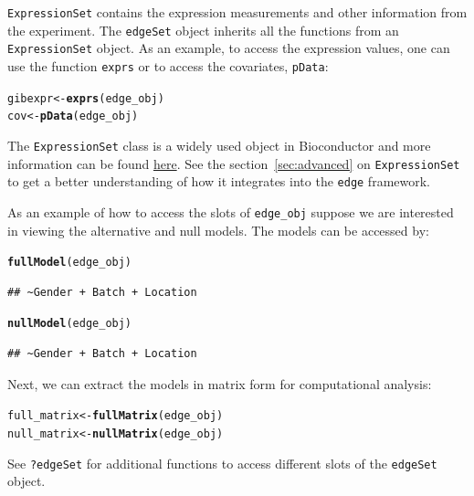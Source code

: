 \documentclass{article}\usepackage[]{graphicx}\usepackage[]{color}
\makeatletter
\newcommand{\hlstd}[1]{\textcolor[rgb]{0.345,0.345,0.345}{#1}}%
\newcommand{\hlkwb}[1]{\textcolor[rgb]{0.69,0.353,0.396}{#1}}%
\newcommand{\hlkwd}[1]{\textcolor[rgb]{0.737,0.353,0.396}{\textbf{#1}}}%
\newenvironment{kframe}{%
 \def\at@end@of@kframe{}%
 \ifinner\ifhmode%
  \def\at@end@of@kframe{\end{minipage}}%
  \begin{minipage}{\columnwidth}%
 \fi\fi%
 \def\FrameCommand##1{\hskip\@totalleftmargin \hskip-\fboxsep
 \colorbox{shadecolor}{##1}\hskip-\fboxsep
     \hskip-\linewidth \hskip-\@totalleftmargin \hskip\columnwidth}%
 \MakeFramed {\advance\hsize-\width
   \@totalleftmargin\z@ \linewidth\hsize
   \@setminipage}}%
 {\par\unskip\endMakeFramed%
 \at@end@of@kframe}
\newenvironment{knitrout}{}{} %
\makeatother
\begin{document}
{\tt ExpressionSet} contains the expression measurements and other information from the experiment. The {\tt edgeSet} object inherits all the functions from an {\tt ExpressionSet} object. As an example, to access the expression values, one can use the function {\tt exprs} or to access the covariates, {\tt pData}:
\begin{knitrout}
\color{fgcolor}\begin{kframe}
\begin{alltt}
\hlstd{gibexpr} \hlkwb{<-} \hlkwd{exprs}\hlstd{(edge_obj)}
\hlstd{cov} \hlkwb{<-} \hlkwd{pData}\hlstd{(edge_obj)}
\end{alltt}
\end{kframe}
\end{knitrout}
The {\tt ExpressionSet} class is a widely used object in Bioconductor and more information can be found \href{http://www.bioconductor.org/packages/2.14/bioc/html/Biobase.html}{here}. See the section~\ref{sec:advanced} on {\tt ExpressionSet} to get a better understanding of how it integrates into the {\tt edge} framework.

As an example of how to access the slots of {\tt edge\_obj} suppose we are interested in viewing the alternative and null models. The models can be accessed by:
\begin{knitrout}
\color{fgcolor}\begin{kframe}
\begin{alltt}
\hlkwd{fullModel}\hlstd{(edge_obj)}
\end{alltt}
\begin{verbatim}
## ~Gender + Batch + Location
\end{verbatim}
\begin{alltt}
\hlkwd{nullModel}\hlstd{(edge_obj)}
\end{alltt}
\begin{verbatim}
## ~Gender + Batch + Location
\end{verbatim}
\end{kframe}
\end{knitrout}

Next, we can extract the models in matrix form for computational analysis:
\begin{knitrout}
\color{fgcolor}\begin{kframe}
\begin{alltt}
\hlstd{full_matrix} \hlkwb{<-} \hlkwd{fullMatrix}\hlstd{(edge_obj)}
\hlstd{null_matrix} \hlkwb{<-} \hlkwd{nullMatrix}\hlstd{(edge_obj)}
\end{alltt}
\end{kframe}
\end{knitrout}
See {\tt ?edgeSet} for additional functions to access different slots of the {\tt edgeSet} object. 
\end{document}
